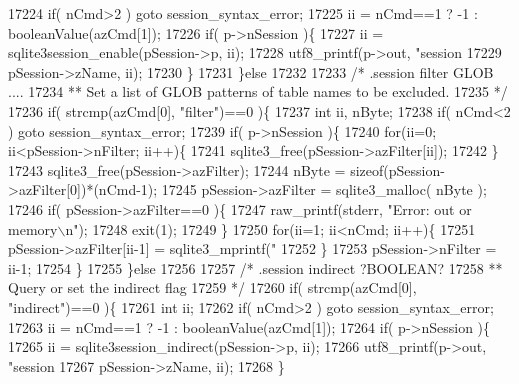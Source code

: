 \begin{DoxyCode}
{{{{{{{{{{{{{{{{{{{{{{{{{{{{{{{{{{{{{{{{{{{{{{{{{{{{{{{{{{{{{{{{{{{{{{{{{{{{{{{{{{{{{{{17224       \textcolor{keywordflow}{if}( nCmd>2 ) \textcolor{keywordflow}{goto} session\_syntax\_error;
17225       ii = nCmd==1 ? -1 : booleanValue(azCmd[1]);
17226       \textcolor{keywordflow}{if}( p->nSession )\{
17227         ii = sqlite3session\_enable(pSession->p, ii);
17228         utf8_printf(p->out, \textcolor{stringliteral}{"session %
17229                     pSession->zName, ii);
17230       \}
17231     \}\textcolor{keywordflow}{else}
17232 
17233     \textcolor{comment}{/* .session filter GLOB ....}
17234 \textcolor{comment}{    ** Set a list of GLOB patterns of table names to be excluded.}
17235 \textcolor{comment}{    */}
17236     \textcolor{keywordflow}{if}( strcmp(azCmd[0], \textcolor{stringliteral}{"filter"})==0 )\{
17237       \textcolor{keywordtype}{int} ii, nByte;
17238       \textcolor{keywordflow}{if}( nCmd<2 ) \textcolor{keywordflow}{goto} session\_syntax\_error;
17239       \textcolor{keywordflow}{if}( p->nSession )\{
17240         \textcolor{keywordflow}{for}(ii=0; ii<pSession->nFilter; ii++)\{
17241           sqlite3_free(pSession->azFilter[ii]);
17242         \}
17243         sqlite3_free(pSession->azFilter);
17244         nByte = \textcolor{keyword}{sizeof}(pSession->azFilter[0])*(nCmd-1);
17245         pSession->azFilter = sqlite3_malloc( nByte );
17246         \textcolor{keywordflow}{if}( pSession->azFilter==0 )\{
17247           raw_printf(stderr, \textcolor{stringliteral}{"Error: out or memory\(\backslash\)n"});
17248           exit(1);
17249         \}
17250         \textcolor{keywordflow}{for}(ii=1; ii<nCmd; ii++)\{
17251           pSession->azFilter[ii-1] = sqlite3_mprintf(\textcolor{stringliteral}{"%
17252         \}
17253         pSession->nFilter = ii-1;
17254       \}
17255     \}\textcolor{keywordflow}{else}
17256 
17257     \textcolor{comment}{/* .session indirect ?BOOLEAN?}
17258 \textcolor{comment}{    ** Query or set the indirect flag}
17259 \textcolor{comment}{    */}
17260     \textcolor{keywordflow}{if}( strcmp(azCmd[0], \textcolor{stringliteral}{"indirect"})==0 )\{
17261       \textcolor{keywordtype}{int} ii;
17262       \textcolor{keywordflow}{if}( nCmd>2 ) \textcolor{keywordflow}{goto} session\_syntax\_error;
17263       ii = nCmd==1 ? -1 : booleanValue(azCmd[1]);
17264       \textcolor{keywordflow}{if}( p->nSession )\{
17265         ii = sqlite3session\_indirect(pSession->p, ii);
17266         utf8_printf(p->out, \textcolor{stringliteral}{"session %
17267                     pSession->zName, ii);
17268       \}
}}}}}}}}}}}}}}}}}}}}}}}}}}}}}}}}}}}}}}}}}}}}}}}}}}}}}}}}}}}}}}}}}}}}}}}}}}}}}}}}}}}}}}}}}}
\end{DoxyCode}
